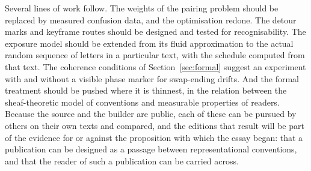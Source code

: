 Several lines of work follow. The weights of the pairing problem should be replaced by measured confusion data, and the optimisation redone. The detour marks and keyframe routes should be designed and tested for recognisability. The exposure model should be extended from its fluid approximation to the actual random sequence of letters in a particular text, with the schedule computed from that text. The coherence conditions of Section~\ref{sec:formal} suggest an experiment with and without a visible phase marker for swap-ending drifts. And the formal treatment should be pushed where it is thinnest, in the relation between the sheaf-theoretic model of conventions and measurable properties of readers. Because the source and the builder are public, each of these can be pursued by others on their own texts and compared, and the editions that result will be part of the evidence for or against the proposition with which the essay began: that a publication can be designed as a passage between representational conventions, and that the reader of such a publication can be carried across.
